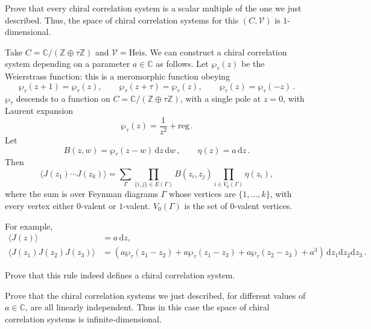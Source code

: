 \documentclass[12pt,letterpaper,reqno]{amsart}
\numberwithin{equation}{section}
\newcommand{\Heis}{{\mathrm{Heis}}}
\newcommand{\bbC}{\ensuremath{\mathbb C}}
\newcommand{\bbZ}{\ensuremath{\mathbb Z}}
\newcommand{\regular}{{\mathrm{reg}}}
\newcommand{\de}{\mathrm{d}}
\newcommand{\vertex}{\mathcal{V}}
\newcommand{\IP}[1]{\langle#1\rangle}
\begin{document}
\begin{exercise} Prove that every 
chiral correlation system
is a scalar multiple of the one we just described. Thus, the space of chiral correlation systems
for this $(C,\vertex)$ is $1$-dimensional.
\end{exercise}

\begin{example}
Take $C = \bbC / (\bbZ \oplus \tau \bbZ)$ and $\vertex=\Heis$. We can construct a chiral 
correlation system depending on a parameter $a \in \bbC$ as follows.
Let $\wp_\tau(z)$ be the Weierstrass function: this is a meromorphic function obeying
\begin{equation}
  \wp_\tau(z + 1) = \wp_\tau(z), \qquad \wp_\tau(z + \tau) = \wp_\tau(z), \qquad \wp_\tau(z) = \wp_\tau(-z) \, .
\end{equation}
$\wp_\tau$ descends to a function on $C = \bbC / (\bbZ \oplus \tau \bbZ)$, with a single pole at $z = 0$, with Laurent expansion
\begin{equation}
  \wp_\tau(z) = \frac{1}{z^2} + \regular \, .
\end{equation}
Let
\[
B(z,w) = \wp_\tau(z-w) \, \de z\,\de w \, , \qquad \eta(z) = a \, \de z \, .
\]
Then
\[
\langle J(z_1)\cdots J(z_k)\rangle
=
\sum_{\Gamma} \prod_{\{i,j\}\in E(\Gamma)} B(z_i,z_j) \prod_{i \in V_0(\Gamma)} \eta(z_i),
\]
where the sum is over Feynman diagrams 
$\Gamma$ whose vertices are $\{1,\dots,k\}$, with every vertex either $0$-valent or $1$-valent. $V_0(\Gamma)$ is the set of 
$0$-valent vertices.

For example,
\begin{align}
\IP{J(z)} &= a \, \de z , \\
 \IP{J(z_1) J(z_2) J(z_3)} &= (a \wp_\tau(z_1-z_2) + a \wp_\tau(z_1-z_3) + a \wp_\tau(z_2-z_3) + a^3) \, \de z_1 \de z_2 \de z_3 \, .
\end{align}
\end{example}

\begin{exercise} Prove that this rule indeed defines
a chiral correlation system.
\end{exercise}

\begin{exercise} Prove that 
the chiral correlation systems we just described, 
for different values of $a \in \bbC$,
are all linearly independent. Thus in this case the space of 
chiral correlation systems is infinite-dimensional.
\end{exercise}
\end{document}
